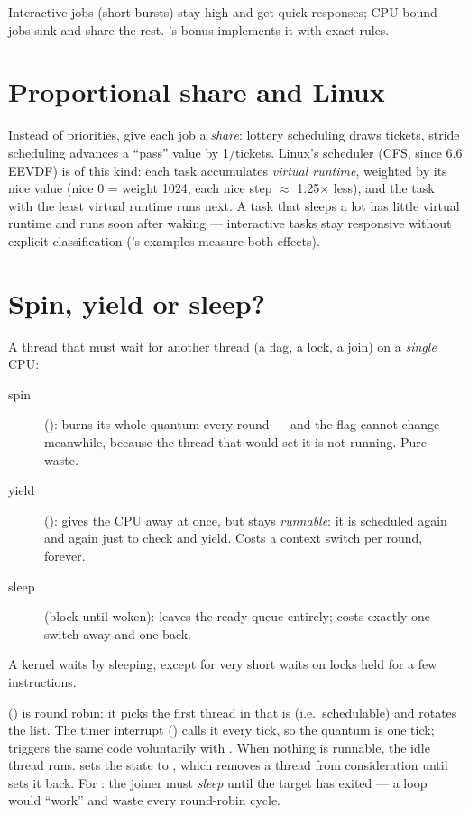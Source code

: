 Interactive jobs (short bursts) stay high and get quick responses;
CPU-bound jobs sink and share the rest. 's bonus implements it
with exact rules.

\section{Proportional share and Linux}

Instead of priorities, give each job a \emph{share}: lottery scheduling
draws tickets, stride scheduling advances a ``pass'' value by
1/tickets. Linux's scheduler (CFS, since 6.6 EEVDF) is of this kind: each
task accumulates \emph{virtual runtime}, weighted by its nice value (nice
0 = weight 1024, each nice step $\approx$ 1.25$\times$ less), and the task
with the least virtual runtime runs next. A task that sleeps a lot has
little virtual runtime and runs soon after waking --- interactive tasks
stay responsive without explicit classification ('s examples
measure both effects).

\section{Spin, yield or sleep?}

A thread that must wait for another thread (a flag, a lock, a join) on a
\emph{single} CPU:

\begin{description}
  \item[spin] (): burns its whole quantum every
    round --- and the flag cannot change meanwhile, because the thread
    that would set it is not running. Pure waste.
  \item[yield] (): gives the CPU away at once,
    but stays \emph{runnable}: it is scheduled again and again just to
    check and yield. Costs a context switch per round, forever.
  \item[sleep] (block until woken): leaves the ready queue entirely; costs
    exactly one switch away and one back.
\end{description}

A kernel waits by sleeping, except for very short waits on locks held
for a few instructions.

\begin{swebbox}
 ()
is round robin: it picks the first thread in  that is
 (i.e.\ schedulable) and rotates the list. The timer
interrupt () calls it every tick, so the quantum is one
tick;  triggers the same code voluntarily with
. When nothing is runnable, the idle thread runs.
 sets the state to , which removes a thread
from consideration until  sets it back. For
: the joiner must \emph{sleep} until the target has
exited --- a  loop would ``work'' and waste
every round-robin cycle.
\end{swebbox}

